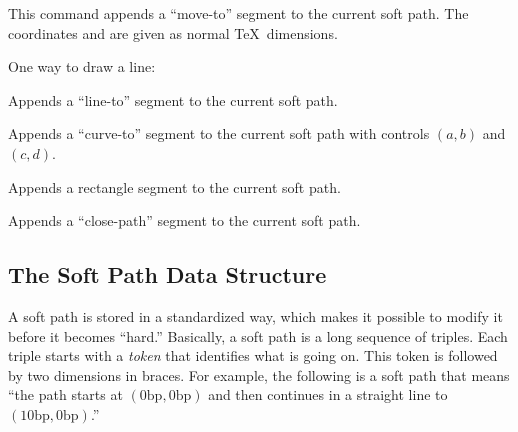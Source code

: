 \begin{command}{\pgfsyssoftpath@moveto{}}
  This command appends a ``move-to'' segment to the current soft
  path. The coordinates  and  are given as normal
  \TeX\ dimensions.

  \example One way to draw a line:
\begin{codeexample}
\pgfsyssoftpath@moveto{0pt}{0pt}
\pgfsyssoftpath@lineto{10pt}{10pt}
\pgfsyssoftpath@flushcurrentpath
\pgfsys@stroke
\end{codeexample}
\end{command}

\begin{command}{\pgfsyssoftpath@lineto{}}
  Appends a ``line-to'' segment to the current soft path.
\end{command}

\begin{command}{\pgfsyssoftpath@curveto{}}
  Appends a ``curve-to'' segment to the current soft path with controls
  $(a,b)$ and $(c,d)$.
\end{command}

\begin{command}{\pgfsyssoftpath@rect{}}
  Appends a rectangle segment to the current soft path.
\end{command}

\begin{command}{\pgfsyssoftpath@closepath}
  Appends a ``close-path'' segment to the current soft path.
\end{command}




\subsection{The Soft Path Data Structure}

A soft path is stored in a standardized way, which makes it possible to
modify it before it becomes ``hard.'' Basically, a soft path is a long
sequence of triples. Each triple starts with a \emph{token} that
identifies what is going on. This token is followed by two dimensions in
braces. For example, the following is a soft path that means ``the
path starts at $(0\mathrm{bp}, 0\mathrm{bp})$ and then
continues in a straight line to $(10\mathrm{bp},
0\mathrm{bp})$.''

\begin{codeexample}
\pgfsyssoftpath@movetotoken{0bp}{0bp}\pgfsyssoftpath@linetotoken{10bp}{0bp}
\end{codeexample}

